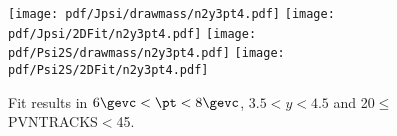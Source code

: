 \begin{figure}[H]
\begin{center}
\texttt{[image: pdf/Jpsi/drawmass/n2y3pt4.pdf]}
\texttt{[image: pdf/Jpsi/2DFit/n2y3pt4.pdf]}
\vspace*{-0.5cm}
\texttt{[image: pdf/Psi2S/drawmass/n2y3pt4.pdf]}
\texttt{[image: pdf/Psi2S/2DFit/n2y3pt4.pdf]}
\vspace*{-0.5cm}
\end{center}
\caption{Fit results in $6\gevc<\pt<8\gevc$, $3.5<y<4.5$ and 20$\leq$PVNTRACKS$<$45.}
\label{Fitn2y3pt4}
\end{figure}

